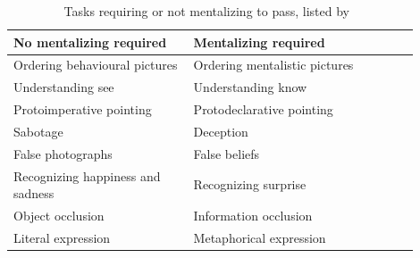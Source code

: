 \begin{table}[h]
    \centering
    \begin{tabular}{p{0.4\linewidth}p{0.5\linewidth}}
        \toprule
        No mentalizing required           & Mentalizing required          \\
        \midrule
        Ordering behavioural pictures     & Ordering mentalistic pictures~\parencite{baron1986mechanical} \\
        Understanding see                 & Understanding know~\parencite{perner1989exploration}            \\
        Protoimperative pointing          & Protodeclarative pointing~\parencite{baron1989perceptual}     \\
        Sabotage                          & Deception~\parencite{sodian1992deception}                     \\
        False photographs                 & False beliefs~\parencite{leslie1992domain}                 \\
        Recognizing happiness and sadness & Recognizing surprise~\parencite{baron1993children}          \\
        Object occlusion                  & Information occlusion~\parencite{baron1992out}         \\
        Literal expression                & Metaphorical expression~\parencite{happe1993communicative}       \\
        \bottomrule
    \end{tabular}
    \caption{\small Tasks requiring or not mentalizing to pass, listed by~\textcite{frith1994autism}}
    \label{mentalizing-tasks}
\end{table}

